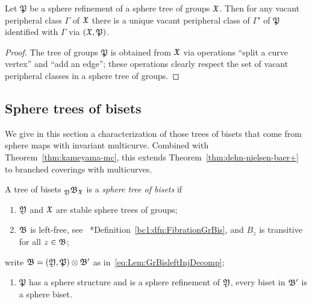 \documentclass{amsart}
\begin{document}
\begin{lem}\label{lem:StabOfVacClass}
  Let $\mathfrak P$ be a sphere refinement of a sphere tree of groups
  ${\mathfrak X}$. Then for any vacant peripheral class $\Gamma$ of ${\mathfrak X}$ there
  is a unique vacant peripheral class of $\Gamma'$ of $\mathfrak P$
  identified with $\Gamma$ via $({\mathfrak X},\mathfrak P)$.
\end{lem}
\begin{proof}
  The tree of groups $\mathfrak P$ is obtained from ${\mathfrak X}$ via
  operations ``split a curve vertex'' and ``add an edge''; these
  operations clearly respect the set of vacant peripheral classes in a
  sphere tree of groups.
\end{proof}

\subsection{Sphere trees of bisets}
We give in this section a characterization of those trees of bisets
that come from sphere maps with invariant multicurve. Combined with
Theorem~\ref{thm:kameyama-mc}, this extends
Theorem~\ref{thm:dehn-nielsen-baer+} to branched coverings with
multicurves.

\begin{defn}\label{defn:SphTreeOfBis}
  A tree of bisets $\subscript\gfY\gfB_\gf$ is a
  \emph{sphere tree of bisets} if
  \begin{enumerate}\renewcommand\theenumi{ST\ensuremath{{}_\arabic{enumi}}}
  \item ${\mathfrak Y}$ and ${\mathfrak X}$ are stable sphere trees of
    groups; \label{cond:1:defn:SphTreeOfBis}
  \item ${\mathfrak B}$ is left-free, see~
    \cite{bartholdi-dudko:bc1}*{Definition~\ref{bc1:dfn:FibrationGrBis}},
    and $B_z$ is transitive for all
    $z\in{\mathfrak B}$; \label{cond:2:defn:SphTreeOfBis}
  \end{enumerate}
  write ${\mathfrak B}= ({\mathfrak Y},\mathfrak P) \otimes {\mathfrak B}'$
  as in~\eqref{eq:Lem:GrBisleftInjDecomp};
  \begin{enumerate}\renewcommand\theenumi{ST\ensuremath{{}_3}}
  \item $\mathfrak P$ has a sphere structure and is a sphere
    refinement of ${\mathfrak Y}$, every biset in ${\mathfrak B}'$ is a
    sphere biset.\label{cond:3:defn:SphTreeOfBis}\qedhere
  \end{enumerate}
\end{defn}
\end{document}
